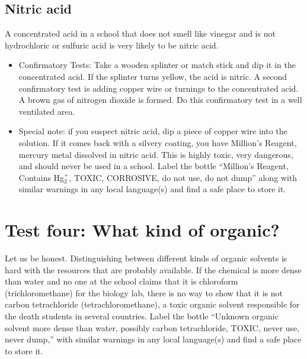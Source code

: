 \subsection{Nitric acid}
A concentrated acid in a school that does not smell like vinegar 
and is not hydrochloric or sulfuric acid is very likely to be nitric acid. 

\begin{itemize}

\item{Confirmatory Tests: Take a wooden splinter 
or match stick and dip it in the concentrated acid. 
If the splinter turns yellow, 
the acid is nitric. 
A second confirmatory test is adding copper wire 
or turnings to the concentrated acid. 
A brown gas of nitrogen dioxide is formed. 
Do this confirmatory test in a well ventilated area.}

\item{Special note: if you suspect nitric acid, 
dip a piece of copper wire into the solution. 
If it comes back with a silvery coating, 
you have Million’s Reagent, 
mercury metal dissolved in nitric acid. 
This is highly toxic, 
very dangerous, 
and should never be used in a school. 
Label the bottle “Million’s Reagent, 
Contains Hg$_{2}^{+}$, 
TOXIC, 
CORROSIVE, 
do not use, 
do not dump” along with similar warnings 
in any local language(s) and find a safe place to store it.}

\end{itemize}

\section{Test four: What kind of organic?}
\label{sec:testorganic}
Let us be honest. 
Distinguishing between different kinds of organic solvents 
is hard with the resources that are probably available. 
If the chemical is more dense than water 
and no one at the school claims that it is chloroform 
(trichloromethane) for the biology lab, 
there is no way to show that it is not carbon tetrachloride 
(tetrachloromethane), 
a toxic organic solvent responsible 
for the death students in several countries. 
Label the bottle ``Unknown organic solvent more dense than water, 
possibly carbon tetrachloride, 
TOXIC, 
never use, 
never dump,'' with similar warnings in any local language(s) 
and find a safe place to store it.

